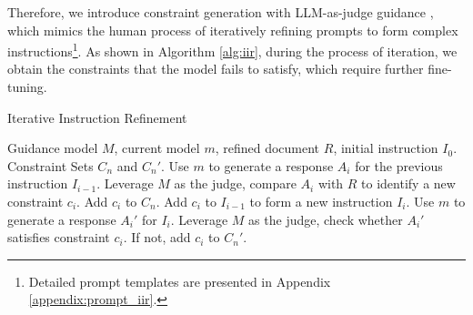 Therefore, we introduce constraint generation with LLM-as-judge guidance \cite{zheng2023judging}, which mimics the human process of iteratively refining prompts to form complex instructions\footnote{Detailed prompt templates are presented in Appendix \ref{appendix:prompt_iir}.}. As shown in Algorithm \ref{alg:iir}, during the process of iteration, we obtain the constraints that the model fails to satisfy, which require further fine-tuning.


\begin{algorithm}[h]
  \renewcommand{\algorithmicrequire}{\textbf{Input:}}
  \renewcommand{\algorithmicensure}{\textbf{Output:}}
  \caption{Iterative Instruction Refinement}
  \label{alg:1}
  \begin{algorithmic}[1]
      \REQUIRE Guidance model $M$, current model $m$, refined document $R$, initial instruction $I_0$.
      \ENSURE Constraint Sets $C_n$ and $C_n'$.
          \STATE Use $m$ to generate a response $A_i$ for the previous instruction $I_{i-1}$.
          \STATE Leverage $M$ as the judge, compare $A_i$ with $R$ to identify a new constraint $c_i$.
          \STATE Add $c_i$ to $C_n$.
          \STATE Add $c_i$ to $I_{i-1}$ to form a new instruction $I_i$.
          \STATE Use $m$ to generate a response $A_{i}'$ for $I_i$.
          \STATE Leverage $M$ as the judge, check whether $A_i'$ satisfies constraint $c_i$. If not, add $c_i$ to $C_n'$. 
      \ENDFOR
  \end{algorithmic}
\label{alg:iir}
\end{algorithm}


